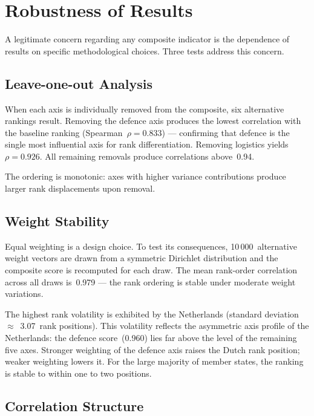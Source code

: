 \section{Robustness of Results}
\label{sec:robustness}

A legitimate concern regarding any composite indicator is the
dependence of results on specific methodological choices.  Three
tests address this concern.

\subsection{Leave-one-out Analysis}

When each axis is individually removed from the composite, six
alternative rankings result.  Removing the defence axis produces
the lowest correlation with the baseline ranking
(Spearman~$\rho = 0.833$) --- confirming that defence is the
single most influential axis for rank differentiation.
Removing logistics yields~$\rho = 0.926$.  All remaining
removals produce correlations above~0.94.

The ordering is monotonic: axes with higher variance contributions
produce larger rank displacements upon removal.

\subsection{Weight Stability}

Equal weighting is a design choice.  To test its consequences,
10\,000~alternative weight vectors are drawn from a symmetric
Dirichlet distribution and the composite score is recomputed for
each draw.  The mean rank-order correlation across all draws
is~0.979 --- the rank ordering is stable under moderate weight
variations.

The highest rank volatility is exhibited by the Netherlands
(standard deviation $\approx$~3.07~rank positions).  This
volatility reflects the asymmetric axis profile of the
Netherlands: the defence score~(0.960) lies far above the level
of the remaining five axes.  Stronger weighting of the defence
axis raises the Dutch rank position; weaker weighting lowers it.
For the large majority of member states, the ranking is stable to
within one to two positions.

\subsection{Correlation Structure}

